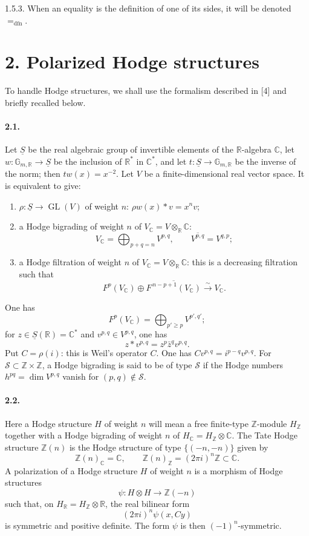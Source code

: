 \documentclass[10pt]{article}
\newcommand{\C}{\mathbb{C}}
\newcommand{\R}{\mathbb{R}}
\newcommand{\Z}{\mathbb{Z}}
\newcommand{\GL}{\operatorname{GL}}
\newcommand{\dfn}{\mathrm{dfn}}
\newcommand{\iso}{\xrightarrow{\sim}}
\begin{document}
1.5.3. When an equality is the definition of one of its sides, it will be denoted $=_{\dfn}$.

\section*{2. Polarized Hodge structures}

To handle Hodge structures, we shall use the formalism described in [4] and briefly recalled below.

\paragraph{2.1.} Let $\underline S$ be the real algebraic group of invertible elements of the $\R$-algebra $\C$, let $w:\mathbb G_{m,\R}\to\underline S$ be the inclusion of $\R^*$ in $\C^*$, and let $t:\underline S\to\mathbb G_{m,\R}$ be the inverse of the norm; then $tw(x)=x^{-2}$. Let $V$ be a finite-dimensional real vector space. It is equivalent to give:
\begin{enumerate}[label=\alph*)]
\item $\rho:\underline S\to\GL(V)$ of weight $n$: $\rho w(x)*v=x^n v$;
\item a Hodge bigrading of weight $n$ of $V_\C=V\otimes_\R\C$:
\[
V_\C=\bigoplus_{p+q=n}V^{p,q},\qquad \overline{V^{p,q}}=V^{q,p};
\]
\item a Hodge filtration of weight $n$ of $V_\C=V\otimes_\R\C$: this is a decreasing filtration such that
\[
F^p(V_\C)\oplus\overline{F^{\,n-p+1}(V_\C)}\iso V_\C.
\]
\end{enumerate}
One has
\[
F^p(V_\C)=\bigoplus_{p'\ge p}V^{p',q'};
\]
for $z\in\underline S(\R)=\C^*$ and $v^{p,q}\in V^{p,q}$, one has
\[
z*v^{p,q}=z^p\bar z^qv^{p,q}.
\]
Put $C=\rho(i)$: this is Weil's operator $C$. One has $Cv^{p,q}=i^{p-q}v^{p,q}$. For $\mathscr S\subset\Z\times\Z$, a Hodge bigrading is said to be of type $\mathscr S$ if the Hodge numbers $h^{pq}=\dim V^{p,q}$ vanish for $(p,q)\notin\mathscr S$.

\paragraph{2.2.} Here a Hodge structure $H$ of weight $n$ will mean a free finite-type $\Z$-module $H_\Z$ together with a Hodge bigrading of weight $n$ of $H_\C=H_\Z\otimes\C$. The Tate Hodge structure $\Z(n)$ is the Hodge structure of type $\{(-n,-n)\}$ given by
\[
\Z(n)_\C=\C,
\qquad
\Z(n)_\Z=(2\pi i)^n\Z\subset\C.
\]
A polarization of a Hodge structure $H$ of weight $n$ is a morphism of Hodge structures
\[
\psi:H\otimes H\longrightarrow\Z(-n)
\]
such that, on $H_\R=H_\Z\otimes\R$, the real bilinear form
\[
(2\pi i)^n\psi(x,Cy)
\]
is symmetric and positive definite. The form $\psi$ is then $(-1)^n$-symmetric.
\end{document}
